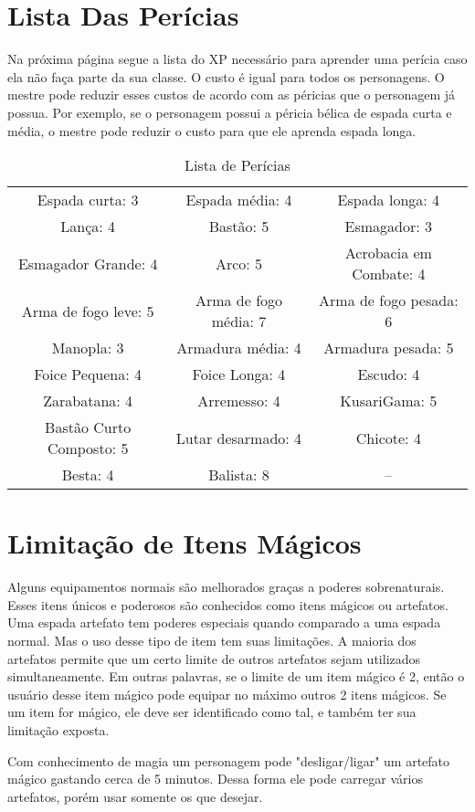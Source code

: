 \section{Lista Das Perícias}

Na próxima página segue a lista do XP necessário para aprender uma perícia caso ela não faça parte da sua classe. O custo é igual para todos os personagens. O mestre pode reduzir esses custos de acordo com as péricias que o personagem já possua. Por exemplo, se o personagem possui a péricia bélica de espada curta e média, o mestre pode reduzir o custo para que ele aprenda espada longa. 


\begin{table}[htbp]
\begin{center}
\begin{tabular}{|c|c|c|} \hline 
Espada curta: 3 &	 Espada média: 4&	 Espada longa: 4 \\\cline{1-3} 
Lança: 4&	 Bastão: 5 &	Esmagador: 3 \\\cline{1-3} 
Esmagador Grande: 4 & Arco: 5 & Acrobacia em Combate: 4 \\\cline{1-3} 
Arma de fogo leve: 5 & Arma de fogo média: 7&	 Arma de fogo pesada: 6	  \\\cline{1-3} 
Manopla: 3&	 Armadura média: 4 & Armadura pesada: 5 \\\cline{1-3} 
Foice Pequena: 4 &	 Foice Longa: 4 &	 Escudo: 4 \\\cline{1-3} 
Zarabatana: 4&	Arremesso: 4&	 KusariGama: 5 \\\cline{1-3} 
Bastão Curto Composto: 5&	 Lutar desarmado: 4 &	 Chicote: 4 \\\cline{1-3} 
Besta: 4&	Balista: 8  & --	
\\ \hline
\end{tabular}
\end{center}
\caption{Lista de Perícias}
\label{}
\end{table}


\section{Limitação de Itens Mágicos}

Alguns equipamentos normais são melhorados graças a poderes sobrenaturais. Esses itens únicos e poderosos são conhecidos como itens mágicos ou artefatos. Uma espada artefato tem poderes especiais quando comparado a uma espada normal. Mas o uso desse tipo de item tem suas limitações. A maioria dos artefatos permite que um certo limite de outros artefatos sejam utilizados simultaneamente. Em outras palavras, se o limite de um item mágico é 2, então o usuário desse item mágico pode equipar no máximo outros 2 itens mágicos. Se um item for mágico, ele deve ser identificado como tal, e também ter sua limitação exposta.

Com conhecimento de magia um personagem pode "desligar/ligar" um artefato mágico gastando cerca de 5 minutos. Dessa forma ele pode carregar vários artefatos, porém usar somente os que desejar. 

